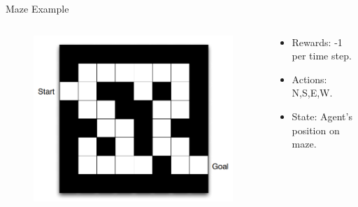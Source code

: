 \documentclass{beamer}
\begin{document}
\begin{frame}{Maze Example}
    \begin{columns}
        \begin{column}{0.5\textwidth}
            \begin{figure}
                \centering
                \includegraphics[width=\textwidth]{images/maze_eg}
            \end{figure}
        \end{column}
        
        \begin{column}{0.5\textwidth}
            \begin{itemize}
                \item Rewards: -1 per time step.
                \item Actions: N,S,E,W.
                \item State: Agent's position on maze.
            \end{itemize}
        \end{column}
    \end{columns}
\end{frame}
\end{document}

